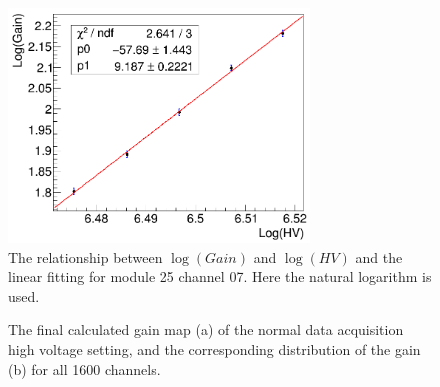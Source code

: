 \documentclass[preprint,sort&compress,12pt]{elsarticle}
\begin{document}
\begin{figure}[!ht]
\centering
\includegraphics[width=8cm]{images/gain_vs_hv_25_07.png}
\caption{The relationship between $\log(Gain)$ and $\log(HV)$ and the linear fitting for module 25 channel 07. Here the natural logarithm is used.} \label{fig:gain_vs_hv}
\end{figure}

\begin{figure}[!ht]
\centering
{}
\hspace{2mm}
\caption{The final calculated gain map (a) of the normal data acquisition high voltage setting, and the corresponding distribution of the gain (b) for all 1600 channels.}\label{fig:gain_bank50}
\end{figure}
\end{document}

